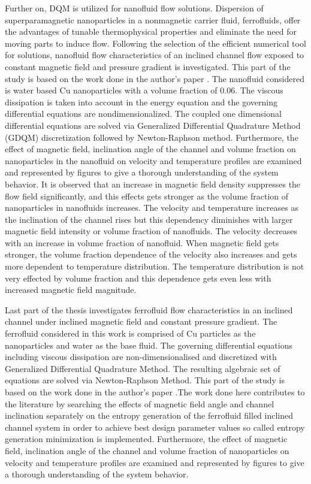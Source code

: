 Further on, DQM is utilized for nanofluid flow solutions. Dispersion of superparamagnetic nanoparticles in a nonmagnetic carrier fluid, ferrofluids, offer the advantages of tunable thermophysical properties and eliminate the need for moving parts to induce flow. Following the selection of the efficient numerical tool for solutions, nanofluid flow characteristics of an inclined channel flow exposed to constant magnetic field and pressure gradient is investigated. This part of the study is based on the work done in the author's paper \cite{baskaya2014investigation}. The nanofluid considered is water based Cu nanoparticles with a volume fraction of 0.06. The viscous dissipation is taken into account in the energy equation and the governing differential equations are nondimensionalized. The coupled one dimensional differential equations are solved via Generalized Differential Quadrature Method (GDQM) discretization followed by Newton-Raphson method. Furthermore, the effect of magnetic field, inclination angle of the channel and volume fraction on nanoparticles in the nanofluid on velocity and temperature profiles are examined and represented by figures to give a thorough understanding of the system behavior.  It is observed that an increase in magnetic field density suppresses the flow field significantly, and this effects gets stronger as the volume fraction of nanoparticles in nanofluids increases. The velocity and temperature increases as the inclination of the channel rises but this dependency diminishes with larger magnetic field intensity or volume fraction of nanofluids. The velocity decreases with an increase in volume fraction of nanofluid. When magnetic field gets stronger, the volume fraction dependence of the velocity also increases and gets more dependent to temperature distribution. The temperature distribution is not very effected by volume fraction and this dependence gets even less with increased magnetic field magnitude.

Last part of the thesis investigates ferrofluid flow characteristics in an inclined channel under inclined magnetic field and constant pressure gradient. The ferrofluid considered in this work is comprised of Cu particles as the nanoparticles and water as the base fluid. The governing differential equations including viscous dissipation are non-dimensionalised and discretized with Generalized Differential Quadrature Method. The resulting algebraic set of equations are solved via Newton-Raphson Method. This part of the study is based on the work done in the author's paper \cite{baskaya2017investigation}.The work done here contributes to the literature by searching the effects of magnetic field angle and channel inclination separately on the entropy generation of the ferrofluid filled inclined channel system in order to achieve best design parameter values so called entropy generation minimization is implemented. Furthermore, the effect of magnetic field, inclination angle of the channel and volume fraction of nanoparticles on velocity and temperature profiles are examined and represented by figures to give a thorough understanding of the system behavior.

